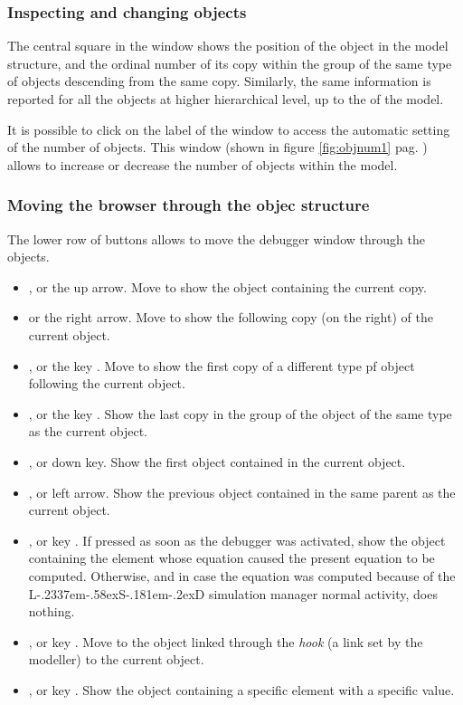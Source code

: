\documentclass [11pt,a4paper] {book}
\def\LsD{{L\kern-.2337em\lower-.58ex\hbox{S}\kern-.181em\lower-.2ex\hbox{D}}\xspace}
\begin{document}
\subsubsection{Inspecting and changing objects}

The central square in the window shows the position of the object in the model structure, and the ordinal number of its copy within the group of the same type of objects descending from the same copy. Similarly, the same information is reported for all the objects at higher hierarchical level, up to the  of the model.

It is possible to click on the  label of the window to access the automatic setting of the number of objects. This window (shown in figure \ref{fig:objnum1} pag. \pageref{fig:objnum1}) allows to increase or decrease the number of objects within the model.

\subsubsection{Moving the browser through the objec structure}

The lower row of buttons allows to move the debugger window through the objects. 
\begin{itemize}
	\item {}, or the up arrow. Move to show the object containing the current copy.
	\item {} or the right arrow. Move to show the following copy (on the right) of the current object.
	\item {}, or the key . Move to show the first copy of a different type pf object following the current object.
	\item {}, or the key . Show the last copy in the group of the object of the same type as the current object.
	\item {}, or down key. Show the first object contained in the current object.
	\item {}, or left arrow. Show the previous object contained in the same parent as the current object.
	\item {}, or key . If pressed as soon as the debugger was activated, show the object containing the element whose equation caused the present equation to be computed. Otherwise, and in case the equation was computed because of the \LsD simulation manager normal activity, does nothing.
	\item {}, or key . Move to the object linked through the \textit{hook} (a link set by the modeller) to the current object.
	\item {}, or key . Show the object containing a specific element with a specific value.
\end{itemize}
\end{document}
